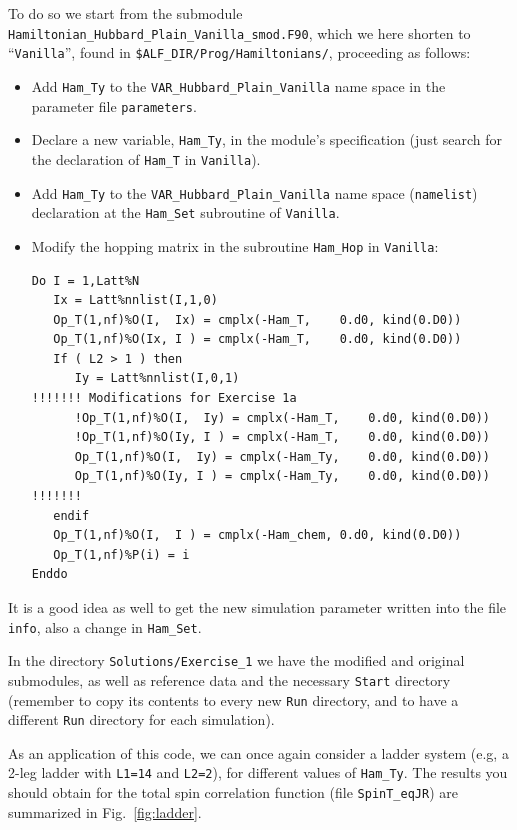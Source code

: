 \documentclass[10pt,modern]{scrartcl}
\numberwithin{exerciseitem}{exercise} %
\begin{document}
To do so we start from the submodule \texttt{Hamiltonian\_Hubbard\_Plain\_Vanilla\_smod.F90}, which we here shorten to ``\texttt{Vanilla}'', found in \texttt{\$ALF\_DIR/Prog/Hamiltonians/}, proceeding as follows: 
\begin{itemize}
	\item Add \texttt{Ham\_Ty} to the \texttt{VAR\_Hubbard\_Plain\_Vanilla} name space in the parameter file \texttt{parameters}.
	\item Declare a new variable, \texttt{Ham\_Ty}, in the module's specification (just search for the declaration of \texttt{Ham\_T} in \texttt{Vanilla}).
	\item Add \texttt{Ham\_Ty} to the \texttt{VAR\_Hubbard\_Plain\_Vanilla} name space (\texttt{namelist}) declaration at the \texttt{Ham\_Set} subroutine of \texttt{Vanilla}.
	\item Modify the hopping matrix in the subroutine \texttt{Ham\_Hop} in \texttt{Vanilla}:
\begin{lstlisting}[style=fortran]
Do I = 1,Latt%N
   Ix = Latt%nnlist(I,1,0)
   Op_T(1,nf)%O(I,  Ix) = cmplx(-Ham_T,    0.d0, kind(0.D0))
   Op_T(1,nf)%O(Ix, I ) = cmplx(-Ham_T,    0.d0, kind(0.D0))
   If ( L2 > 1 ) then
      Iy = Latt%nnlist(I,0,1)
!!!!!!! Modifications for Exercise 1a
      !Op_T(1,nf)%O(I,  Iy) = cmplx(-Ham_T,    0.d0, kind(0.D0))
      !Op_T(1,nf)%O(Iy, I ) = cmplx(-Ham_T,    0.d0, kind(0.D0))
      Op_T(1,nf)%O(I,  Iy) = cmplx(-Ham_Ty,    0.d0, kind(0.D0))
      Op_T(1,nf)%O(Iy, I ) = cmplx(-Ham_Ty,    0.d0, kind(0.D0))
!!!!!!!
   endif
   Op_T(1,nf)%O(I,  I ) = cmplx(-Ham_chem, 0.d0, kind(0.D0))
   Op_T(1,nf)%P(i) = i 
Enddo
\end{lstlisting} 
\end{itemize}
It is a good idea as well to get the new simulation parameter written into the file \texttt{info}, also a change in \texttt{Ham\_Set}.

In the directory \texttt{Solutions/Exercise\_1} we have the modified and original submodules, as well as reference data and the necessary \texttt{Start} directory (remember to copy its contents to every new \texttt{Run} directory, and to have a different \texttt{Run} directory for each simulation).

As an application of this code, we can once again consider a ladder system (e.g, a 2-leg ladder with \texttt{L1=14} and \texttt{L2=2}), for different values of \texttt{Ham\_Ty}. The results you should obtain for the total spin correlation function (file \texttt{SpinT\_eqJR}) are summarized in Fig.~\ref{fig:ladder}.
\end{document}
